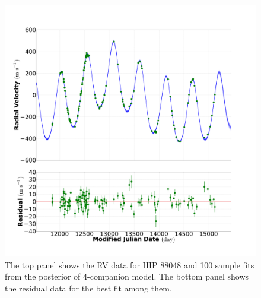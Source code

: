 \documentclass[letterpaper, preprint]{aastex}
\begin{document}
\begin{figure}
 \includegraphics[width=0.99\linewidth]{fit_res_282_mod_4_20130930.png}
 \caption{The top panel shows the RV data for HIP 88048 and 100 sample fits from the posterior of 4-companion model. The bottom panel shows the residual data for the best fit among them.}
 \label{fig:282-4-fit}
\end{figure}
\end{document}
